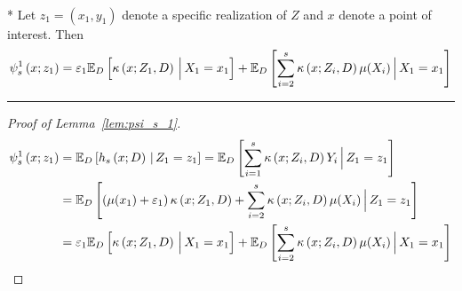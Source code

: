 \begin{lem}\label{lem:psi_s_1}\mbox{}\\*
	Let $z_1 = (x_1, y_1)$ denote a specific realization of $Z$ and $x$ denote a point of interest.
	Then
	\begin{equation}
		\psi_{s}^{1}\left(x; z_1\right)
		= \varepsilon_1 \mathbb{E}_D\left[\kappa\left(x; Z_1, D\right)\, \Big| \, X_1 = x_1 \right]
		+ \mathbb{E}_{D}\left[\sum_{i = 2}^{s} \kappa\left(x; Z_{i}, D\right) \mu(X_{i})\, \Big| \, X_1 = x_1 \right]
	\end{equation}
\end{lem}
\hrule
\begin{proof}[Proof of Lemma~\ref{lem:psi_s_1}]
	\begin{equation}
		\begin{aligned}
			\psi_{s}^{1}\left(x; z_1\right)
			 & = \mathbb{E}_{D}\left[h_{s}\left(x; D\right) \, | \, Z_1 = z_1 \right]
			= \mathbb{E}_{D}\left[\sum_{i = 1}^{s} \kappa\left(x; Z_{i}, D\right) Y_{i} \, \Big| \, Z_1 = z_1 \right] \\
			 & = \mathbb{E}_{D}\left[\left(\mu(x_1) + \varepsilon_1\right)\kappa\left(x; Z_1, D\right)
			+ \sum_{i = 2}^{s} \kappa\left(x; Z_{i}, D\right) \mu(X_{i})\, \Big| \, Z_1 = z_1 \right]         \\
			 & = \varepsilon_1 \mathbb{E}_D\left[\kappa\left(x; Z_1, D\right)\, \Big| \, X_1 = x_1 \right]
			+ \mathbb{E}_{D}\left[\sum_{i = 2}^{s} \kappa\left(x; Z_{i}, D\right) \mu(X_{i})\, \Big| \, X_1 = x_1 \right]
		\end{aligned}
	\end{equation}
\end{proof}
